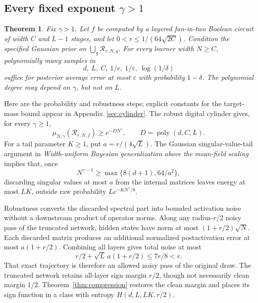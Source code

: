 \documentclass[11pt]{article}
\newtheorem{theorem}{Theorem}[section]
\newcommand{\poly}{\operatorname{poly}}
\begin{document}
\subsection{Every fixed exponent \texorpdfstring{$\gamma>1$}{gamma > 1}}

\begin{theorem}\label{thm:gamma}
Fix $\gamma>1$. Let $f$ be computed by a layered fan-in-two Boolean circuit
of width $C$ and $L-1$ stages, and let
$0<r\le1/(64\sqrt{2C})$. Condition the specified Gaussian prior on
$\bigcup_g\mathcal R_{r,N,g}$. For every learner width $N\ge C$,
polynomially many samples in
\[
 d,\ L,\ C,\ 1/r,\ 1/\varepsilon,\ \log(1/\delta)
\]
suffice for posterior average error at most $\varepsilon$ with probability
$1-\delta$. The polynomial degree may depend on $\gamma$, but not on $L$.
\end{theorem}

Here are the probability and robustness steps; explicit constants for the
target-mass bound appear in Appendix~\ref{sec:cylinder}.
The robust digital cylinder gives, for every $\gamma\ge1$,
\begin{equation}\label{eq:targetmass}
 \mu_{N,\gamma}(\mathcal R_{r,N,f})\ge e^{-DN^\gamma},
 \qquad D=\poly(d,C,L).
\end{equation}
For a tail parameter $K\ge1$, put $a=r/(4\sqrt L)$.
The Gaussian singular-value-tail argument in
\emph{Width-uniform Bayesian generalization above the mean-field
scaling}~\cite{aboveone} implies that, once
\[
 N^{\gamma-1}\ge\max\{8(d+1),64/a^2\},
\]
discarding singular values at most $a$ from the internal matrices leaves
energy at most $LK$, outside raw probability $Le^{-KN^\gamma/8}$.

Robustness converts the discarded spectral part into bounded activation
noise without a downstream product of operator norms.
Along any radius-$r/2$ noisy pass of the truncated network, hidden states
have norm at most $(1+r/2)\sqrt N$. Each discarded matrix produces an
additional normalized postactivation error at most $a(1+r/2)$. Combining
all layers gives total noise at most
\[
 r/2+\sqrt L\,a(1+r/2)\le7r/8<r.
\]
That exact trajectory is therefore an allowed noisy pass of the original
draw. The truncated network retains all-layer sign margin $r/2$, though
not necessarily clean margin $1/2$. Theorem~\ref{thm:compression} restores
the clean margin and places its sign function in a class with entropy
$H(d,L,LK,r/2)$.
\end{document}

